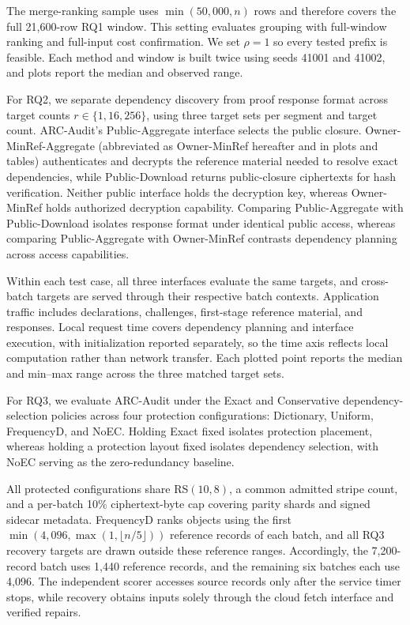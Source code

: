 \documentclass[10pt,journal]{IEEEtran}
\begin{document}
The merge-ranking sample uses $\min(50{,}000,n)$ rows and therefore covers the full 21,600-row RQ1 window. This setting evaluates grouping with full-window ranking and full-input cost confirmation. We set $\rho=1$ so every tested prefix is feasible. Each method and window is built twice using seeds 41001 and 41002, and plots report the median and observed range.

For RQ2, we separate dependency discovery from proof response format across target counts $r\in\{1,16,256\}$, using three target sets per segment and target count. ARC-Audit's Public-Aggregate interface selects the public closure. Owner-MinRef-Aggregate (abbreviated as Owner-MinRef hereafter and in plots and tables) authenticates and decrypts the reference material needed to resolve exact dependencies, while Public-Download returns public-closure ciphertexts for hash verification. Neither public interface holds the decryption key, whereas Owner-MinRef holds authorized decryption capability. Comparing Public-Aggregate with Public-Download isolates response format under identical public access, whereas comparing Public-Aggregate with Owner-MinRef contrasts dependency planning across access capabilities.

Within each test case, all three interfaces evaluate the same targets, and cross-batch targets are served through their respective batch contexts. Application traffic includes declarations, challenges, first-stage reference material, and responses. Local request time covers dependency planning and interface execution, with initialization reported separately, so the time axis reflects local computation rather than network transfer. Each plotted point reports the median and min--max range across the three matched target sets.

For RQ3, we evaluate ARC-Audit under the Exact and Conservative dependency-selection policies across four protection configurations: Dictionary, Uniform, FrequencyD, and NoEC. Holding Exact fixed isolates protection placement, whereas holding a protection layout fixed isolates dependency selection, with NoEC serving as the zero-redundancy baseline.

All protected configurations share RS$(10,8)$, a common admitted stripe count, and a per-batch 10\% ciphertext-byte cap covering parity shards and signed sidecar metadata. FrequencyD ranks objects using the first $\min(4{,}096,\max(1,\lfloor n/5\rfloor))$ reference records of each batch, and all RQ3 recovery targets are drawn outside these reference ranges. Accordingly, the 7,200-record batch uses 1,440 reference records, and the remaining six batches each use 4,096. The independent scorer accesses source records only after the service timer stops, while recovery obtains inputs solely through the cloud fetch interface and verified repairs.
\end{document}
